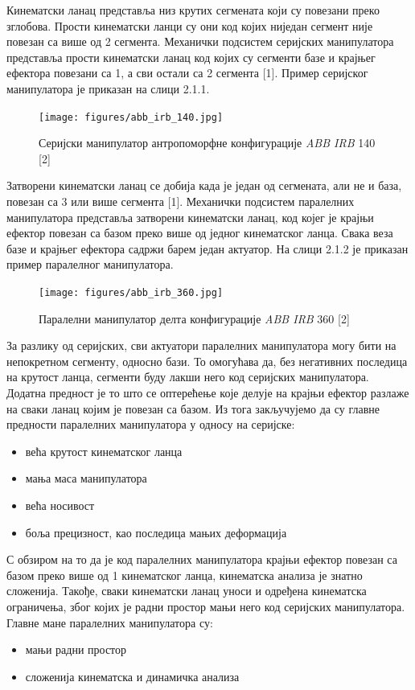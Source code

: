 \documentclass[12pt]{article}
\begin{document}
Кинематски ланац представља низ крутих сегмената који су повезани преко зглобова. Прости кинематски ланци су они код којих ниједан сегмент није повезан са више од 2 сегмента. Механички подсистем серијских манипулатора представља прости кинематски ланац код којих су сегменти базе и крајњег ефектора повезани са 1, а сви остали са 2 сегмента [1]. Пример серијског манипулатора је приказан на слици 2.1.1.

\begin{figure}[H]
    \centering
    \texttt{[image: figures/abb\_irb\_140.jpg]}
    \caption{Серијски манипулатор антропоморфне конфигурације \textit{ABB IRB} 140 [2]}
    \label{fig:серијски_манипулатор}
\end{figure}

Затворени кинематски ланац се добија када је један од сегмената, али не и база, повезан са 3 или више сегмента [1]. Механички подсистем паралелних манипулатора представља затворени кинематски ланац, код којег је крајњи ефектор повезан са базом преко више од једног кинематског ланца. Свака веза базе и крајњег ефектора садржи барем један актуатор. На слици 2.1.2 је приказан пример паралелног манипулатора.

\begin{figure}[H]
    \centering
    \texttt{[image: figures/abb\_irb\_360.jpg]}
    \caption{Паралелни манипулатор делта конфигурације \textit{ABB IRB} 360 [2]}
    \label{fig:паралелни_манипулатор}
\end{figure}

За разлику од серијских, сви актуатори паралелних манипулатора могу бити на непокретном сегменту, односно бази. То омогућава да, без негативних последица на крутост ланца, сегменти буду лакши него код серијских манипулатора. Додатна предност је то што се оптерећење које делује на крајњи ефектор разлаже на сваки ланац којим је повезан са базом. Из тога закључујемо да су главне предности паралелних манипулатора у односу на серијске:
\begin{itemize}
    \item већа крутост кинематског ланца
    \item мања маса манипулатора
    \item већа носивост
    \item боља прецизност, као последица мањих деформација
\end{itemize}
С обзиром на то да је код паралелних манипулатора крајњи ефектор повезан са базом преко више од 1 кинематског ланца, кинематска анализа је знатно сложенија. Такође, сваки кинематски ланац уноси и одређена кинематска ограничења, због којих је радни простор мањи него код серијских манипулатора. 
Главне мане паралелних манипулатора су:
\begin{itemize}
    \item мањи радни простор
    \item сложенија кинематска и динамичка анализа
\end{itemize}
\end{document}
